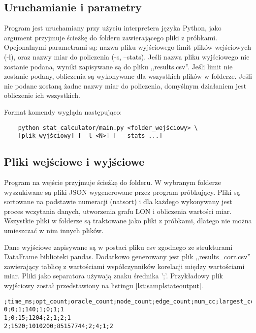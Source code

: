 \subsection{Uruchamianie i parametry}

Program jest uruchamiany przy użyciu interpretera języka Python, jako argument przyjmuje
ścieżkę do folderu zawierającego pliki z próbkami. Opcjonalnymi parametrami są: nazwa pliku wyjściowego
limit plików wejściowych (-l), oraz nazwy miar do policzenia (-s, --stats). Jeśli nazwa pliku wyjściowego nie zostanie podana, wyniki zapisywane
są do pliku ,,results.csv''. Jeśli limit nie zostanie podany, obliczenia są wykonywane dla wszystkich plików w folderze.
Jeśli nie podane zostaną żadne nazwy miar do policzenia, domyślnym działaniem jest obliczenie ich wszystkich.

Format komendy wygląda następująco:
\begin{lstlisting}
    python stat_calculator/main.py <folder_wejściowy> \
    [plik_wyjściowy] [ -l <N>] [ --stats ...]
\end{lstlisting}

\subsection{Pliki wejściowe i wyjściowe}
Program na wejście przyjmuje ścieżkę do folderu. W wybranym folderze wyszukiwane są pliki JSON wygenerowane przez program próbkujący.
Pliki są sortowane na podstawie numeracji (natsort) i dla każdego wykonywany jest proces wczytania danych, utworzenia grafu LON i obliczenia
wartości miar. Wszystkie pliki w folderze są traktowane jako pliki z próbkami, dlatego nie można umieszczać w nim innych plików.

Dane wyjściowe zapisywane są w postaci pliku csv zgodnego ze strukturami DataFrame biblioteki pandas.
Dodatkowo generowany jest plik ,,results\_corr.csv'' zawierający tablicę z wartościami współczynników korelacji
między wartościami miar. Pliki jako separatora używają znaku średnika ';'.
Przykładowy plik wyjściowy został przedstawiony na listingu \ref{lst:samplstateoutput}.

\begin{lstlisting}[caption={Przykład pliku wyjściowego z obliczonymi miarami num\_cc i largest\_cc}, label=lst:samplstateoutput]
;time_ms;opt_count;oracle_count;node_count;edge_count;num_cc;largest_cc
0;0;1;140;1;0;1;1
1;0;15;1204;2;1;2;1
2;1520;1010200;85157744;2;4;1;2
\end{lstlisting}


